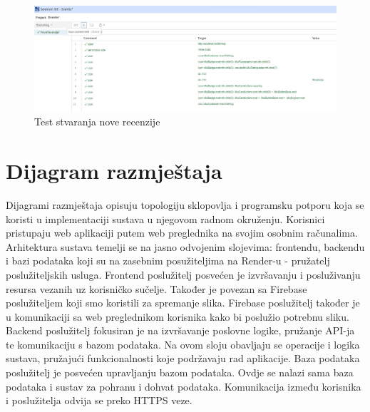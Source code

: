 			\begin{figure}[H]
				\includegraphics[scale=0.30]{testovi/novarecenzija.jpg}
				\centering
				\caption{Test stvaranja nove recenzije}
				\label{fig:promjene}
			\end{figure}
			
		
		
		\section{Dijagram razmještaja}
			
			Dijagrami razmještaja opisuju topologiju sklopovlja i programsku potporu koja se koristi u implementaciji sustava u njegovom radnom okruženju. Korisnici pristupaju web aplikaciji putem web preglednika na svojim osobnim računalima. Arhitektura sustava temelji se na jasno odvojenim slojevima: frontendu, backendu i bazi podataka koji su na zasebnim posužiteljima na Render-u - pružatelj poslužiteljskih usluga. 
			Frontend poslužitelj posvećen je izvršavanju i posluživanju resursa vezanih uz korisničko sučelje. Također je povezan sa Firebase poslužiteljem koji smo koristili za spremanje slika. Firebase poslužitelj također je u komunikaciji sa web preglednikom korisnika kako bi poslužio potrebnu sliku. Backend poslužitelj fokusiran  je na izvršavanje poslovne logike, pružanje API-ja te komunikaciju s bazom podataka. Na ovom sloju obavljaju se operacije i logika sustava, pružajući funkcionalnosti koje podržavaju rad aplikacije. Baza podataka poslužitelj je posvećen upravljanju bazom podataka. Ovdje se nalazi sama baza podataka i sustav za pohranu i dohvat podataka.  Komunikacija između korisnika i poslužitelja odvija se preko HTTPS veze.
			 
